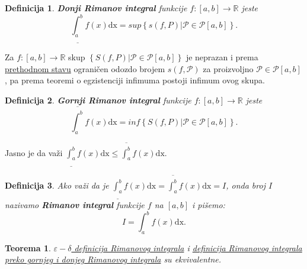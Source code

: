 \documentclass{article}
\newtheorem{definicija}{Definicija}[section]
\newtheorem{teorema}{Teorema}[section]
\begin{document}
\begin{defbox}
    \label{definicija_2.6}
    \begin{definicija}
        \textbf{Donji Rimanov integral} funkcije $f: \left[a,b\right]\longrightarrow\mathbb{R}$ jeste
        $$\underline{\int_{a}^{b}}f\left(x\right)\text{dx}=sup\left\{s\left(f,P\right)\big|\mathcal{P}\in\mathcal{P}\left[a,b\right]\right\}.$$
    \end{definicija}
\end{defbox}

Za $f: \left[a,b\right]\longrightarrow\mathbb{R}$ skup $\left\{S\left(f,P\right)\big|\mathcal{P}\in\mathcal{P}\left[a,b\right]\right\}$
je neprazan i prema \hyperref[stav_2.2]{prethodnom stavu} ograničen odozdo brojem $s\left(f,\mathcal{P}\right)$ za proizvoljno $\mathcal{P}\in\mathcal{P}\left[a,b\right]$,
pa prema teoremi o egzistenciji infimuma postoji infimum ovog
skupa.

\begin{defbox}
    \label{definicija_2.7}
    \begin{definicija}
        \textbf{Gornji Rimanov integral} funkcije $f: \left[a,b\right]\longrightarrow\mathbb{R}$ jeste
        $$\overline{\int_{a}^{b}}f\left(x\right)\text{dx}=inf\left\{S\left(f,P\right)\big|\mathcal{P}\in\mathcal{P}\left[a,b\right]\right\}.$$
    \end{definicija}
\end{defbox}

Jasno je da važi $\displaystyle\underline{\int_{a}^{b}}f\left(x\right)\text{dx}\leq\overline{\int_{a}^{b}}f\left(x\right)\text{dx}$.

\begin{defbox}
    \label{definicija_2.8}
    \begin{definicija}
        Ako važi da je $\displaystyle\underline{\int_{a}^{b}}f\left(x\right)\text{dx}=\overline{\int_{a}^{b}}f\left(x\right)\text{dx}=I$,
        onda broj $I$ nazivamo \textbf{Rimanov integral} funkcije $f$ na $\left[a,b\right]$ i pišemo:
        $$I=\int_{a}^{b}f\left(x\right)\text{dx}.$$
    \end{definicija}
\end{defbox}

\begin{teoremabox}
    \label{teorema_2.2}
    \begin{teorema}
        \hyperref[definicija_2.3]{$\varepsilon-\delta$ definicija Rimanovog integrala} i \hyperref[definicija_2.8]{definicija Rimanovog integrala preko gornjeg i donjeg Rimanovog integrala}
        su ekvivalentne.
    \end{teorema}
\end{teoremabox}
\end{document}
